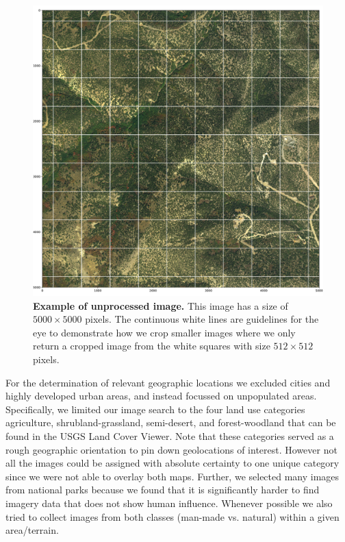 \begin{figure}[h!]
	\centering
	\captionsetup{width=1\linewidth}
	\includegraphics[width=1\textwidth]{Figures/example_unproc.pdf}
	\caption{\textbf{Example of unprocessed image.} This image has a size of $5000\times5000$ pixels. The continuous white lines are guidelines for the eye to demonstrate how we crop smaller images where we only return a cropped image from the white squares with size $512\times512$ pixels.}
	\label{fig:example-unproc}
\end{figure}

For the determination of relevant geographic locations we excluded cities and highly developed urban areas, and instead focussed on unpopulated areas. Specifically, we limited our image search to the four land use categories agriculture, shrubland-grassland, semi-desert, and forest-woodland that can be found in the USGS Land Cover Viewer. Note that these categories served as a rough geographic orientation to pin down geolocations of interest. However not all the images could be assigned with absolute certainty to one unique category since we were not able to overlay both maps. Further, we selected many images from national parks because we found that it is significantly harder to find imagery data that does not show human influence. Whenever possible we also tried to collect images from both classes (man-made vs. natural) within a given area/terrain.

